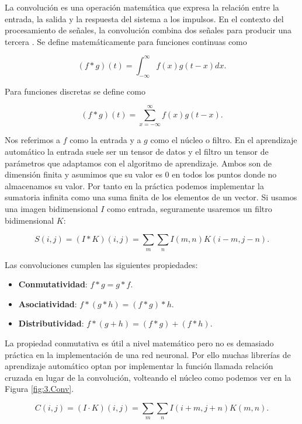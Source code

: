 La convolución es una operación matemática que expresa la relación entre la entrada, la salida y la respuesta del sistema a los impulsos. En el contexto del procesamiento de señales, la convolución combina dos señales para producir una tercera \cite{GoodFellowBook}. Se define matemáticamente para funciones continuas como

$$ (f \ast g)(t) = \int_{-\infty}^{\infty} f(x)g(t-x)dx.$$

Para funciones discretas se define como

$$ (f \ast g)(t) = \sum_{x=-\infty}^{\infty} f(x)g(t-x).$$

Nos referimos a $f$ como la entrada y a $g$ como el núcleo o filtro. En el aprendizaje automático la entrada suele ser un tensor de datos y el filtro un tensor de parámetros que adaptamos con el algoritmo de aprendizaje. Ambos son de dimensión finita y asumimos que su valor es 0 en todos los puntos donde no almacenamos su valor. Por tanto en la práctica podemos implementar la sumatoria infinita como una suma finita de los elementos de un vector. Si usamos una imagen bidimensional $I$ como entrada, seguramente usaremos un filtro bidimensional $K$:

$$S(i,j) = (I \ast K)(i,j) = \sum_m \sum_n I(m,n)K(i-m,j-n).$$


Las convoluciones cumplen las siguientes propiedades:

\begin{itemize}

	\item \textbf{Conmutatividad}: $f \ast g = g \ast f$.
	
	\item \textbf{Asociatividad}: $f \ast (g \ast h ) = ( f \ast g) \ast h$.
	
	\item \textbf{Distributividad}: $f \ast (g + h) = (f \ast g) + (f \ast h)$.

\end{itemize}

La propiedad conmutativa es útil a nivel matemático pero no es demasiado práctica en la implementación de una red neuronal. Por ello muchas librerías de aprendizaje automático optan por implementar la función llamada relación cruzada en lugar de la convolución, volteando el núcleo como podemos ver en la Figura \ref{fig:3.Conv}.

$$C(i,j)= (I \cdot K)(i,j) = \sum_m \sum_n I(i+m,j+n)K(m,n).$$


